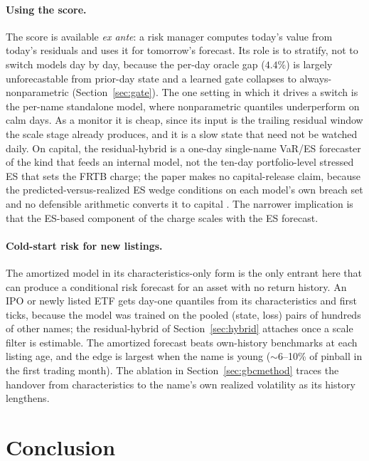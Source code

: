 \documentclass[11pt]{article}
\theoremstyle{remark}
\begin{document}
\paragraph{Using the score.} The score is available \emph{ex ante}: a
risk manager computes today's value from today's residuals and uses it
for tomorrow's forecast. Its role is to stratify, not to switch models
day by day, because the per-day oracle gap ($4.4\%$) is largely unforecastable from
prior-day state and a learned gate collapses to always-nonparametric
(Section~\ref{sec:gate}). The one setting in which it drives a switch is
the per-name standalone model, where nonparametric quantiles underperform
on calm days. As a monitor it is cheap, since its input is the trailing
residual window the scale stage already produces, and it is a slow state
that need not be watched daily. On capital, the residual-hybrid is a
one-day single-name VaR/ES forecaster of the kind that feeds an internal
model, not the ten-day portfolio-level stressed ES that sets the FRTB
charge; the paper makes no capital-release claim, because the
predicted-versus-realized ES wedge conditions on each model's own breach
set and no defensible arithmetic converts it to capital
\citep{bcbs2019frtb}. The narrower implication is that the ES-based
component of the charge scales with the ES forecast.

\paragraph{Cold-start risk for new listings.} The amortized model in its
characteristics-only form is the only entrant here that can produce a
conditional risk forecast for an asset with no return history. An IPO or
newly listed ETF gets day-one quantiles from its characteristics and
first ticks, because the model was trained on the pooled (state, loss)
pairs of hundreds of other names; the residual-hybrid of
Section~\ref{sec:hybrid} attaches once a scale filter is estimable. The
amortized forecast beats own-history benchmarks at each listing age, and
the edge is largest when the name is young ($\sim$6--10\% of pinball in
the first trading month). The ablation in Section~\ref{sec:gbcmethod}
traces the handover from characteristics to the name's own realized
volatility as its history lengthens.


\section{Conclusion}\label{sec:limitations}
\end{document}
